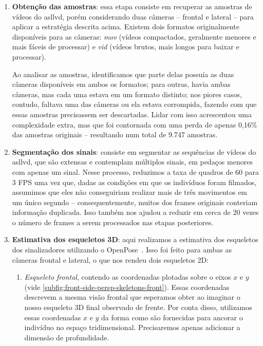 \begin{enumerate}
    \item \textbf{Obtenção das amostras}: essa etapa consiste em recuperar as amostras de vídeos do \acrshort{asllvd}, porém considerando duas câmeras -- frontal e lateral -- para aplicar a estratégia descrita acima. Existem dois formatos originalmente disponíveis para as câmeras: \textit{mov} (vídeos compactados, geralmente menores e mais fáceis de processar) e \textit{vid} (vídeos brutos, mais longos para baixar e processar).

          Ao analisar as amostras, identificamos que parte delas possuía as duas câmeras disponíveis em ambos os formatos; para outras, havia ambas câmeras, mas cada uma estava em um formato distinto; nos piores casos, contudo, faltava uma das câmeras ou ela estava corrompida, fazendo com que essas amostras precisassem ser descartadas. Lidar com isso acrescentou uma complexidade extra, mas que foi contornada com uma perda de apenas 0,16\% das amostras originais -- resultando num total de 9.747 amostras.

    \item \textbf{Segmentação dos sinais}: consiste em segmentar as sequências de vídeos do \acrshort{asllvd}, que são extensas e contemplam múltiplos sinais, em pedaços menores com apenas um sinal. Nesse processo, reduzimos a taxa de quadros de 60 para 3 FPS uma vez que, dadas as condições em que os indivíduos foram filmados, assumimos que eles não conseguiriam realizar mais de três movimentos em um único segundo -- consequentemente, muitos dos frames originais conteriam informação duplicada. Isso também nos ajudou a reduzir em cerca de 20 vezes o número de frames a serem processados nas etapas posteriores.

    \item \textbf{Estimativa dos esqueletos 3D}: aqui realizamos a estimativa dos esqueletos dos sinalizadores utilizando o OpenPose~\cite{cao-2019-openpose,simon-2017-openpose-hand-face}. Isso foi feito para ambas as câmeras frontal e lateral, o que nos rendeu dois esqueletos 2D:

          \begin{enumerate}
              \item \textit{Esqueleto frontal}, contendo as coordenadas plotadas sobre o eixos \(x\) e \(y\) (vide \autoref{subfig:front-side-persp-skeletons-front}).
                    Essas coordenadas descrevem a mesma visão frontal que esperamos obter ao imaginar o nosso esqueleto 3D final observado de frente. Por conta disso, utilizamos essas coordenadas \(x\) e \(y\) da forma como são fornecidas para ancorar o indivíduo no espaço tridimensional. Precisaremos apenas adicionar a dimensão de profundidade.


\end{enumerate}
\end{enumerate}
